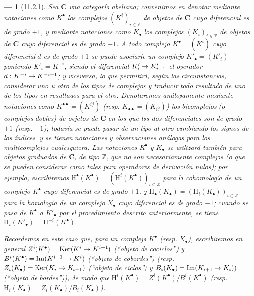 \documentclass[10pt,oneside,openany]{book}
\theoremstyle{egaenv}\newtheorem*{env}{---}
\theoremstyle{egastatement}
\theoremstyle{egadescription}
\renewcommand{\to}{\mathchoice{\longrightarrow}{\rightarrow}{\rightarrow}{\rightarrow}}
\begin{document}
\begin{env}[11.2.1]
\label{0.11.2.1}
\label{0.11.2.1-fr}
Sea $\boldsymbol{C}$ una categoría abeliana; convenimos en denotar mediante notaciones como $K^\bullet$ los \emph{complejos $(K^i)_{i\in\mathbb Z}$} de objetos de $\boldsymbol{C}$ cuyo diferencial es de grado $+1$, y mediante notaciones como $K_\bullet$ los complejos $(K_i)_{i\in\mathbb Z}$ de objetos de $\boldsymbol{C}$ cuyo diferencial es de grado $-1$.
A todo complejo $K^\bullet=(K^i)$ cuyo diferencial $d$ es de grado $+1$ se puede asociarle un complejo $K'_\bullet=(K'_i)$ poniendo $K'_i=K^{-i}$, siendo el diferencial $K'_i\to K'_{i-1}$ el operador $d:K^{-i}\to K^{-i+1}$; y \emph{viceversa}, lo que permitirá, según las circunstancias, considerar uno u otro de los tipos de complejos y traducir todo resultado de uno de los tipos en resultados para el otro.
Denotaremos análogamente mediante notaciones como $K^{\bullet\bullet}=(K^{ij})$ (resp. $K_{\bullet\bullet}=(K_{ij})$) los \emph{bicomplejos} (o \emph{complejos dobles}) de objetos de $\boldsymbol{C}$ en los que los \emph{dos} diferenciales son de grado $+1$ (resp. $-1$); todavía se puede pasar de un tipo al otro cambiando los signos de los índices, y se tienen notaciones y observaciones análogas para los multicomplejos cualesquiera.
Las notaciones $K^\bullet$ y $K_\bullet$ se utilizará también para \emph{objetos graduados} de $\boldsymbol{C}$, de tipo $\mathbb Z$, que no son necesariamente complejos (o que se pueden considerar como tales para operadores de derivación \emph{nulos}); por ejemplo, escribiremos
$\mathrm H^\bullet(K^\bullet)=(\mathrm H^i(K^\bullet))_{i\in\mathbb Z}$ para la \emph{cohomología} de un complejo $K^\bullet$ cuyo diferencial es de grado $+1$, y $\mathrm H_\bullet(K_\bullet)=(\mathrm H_i(K_\bullet))_{i\in\mathbb Z}$ para la \emph{homología} de un complejo $K_\bullet$ cuyo diferencial es de grado $-1$; cuando se pasa de $K^\bullet$ a $K'_\bullet$ por el procedimiento descrito anteriormente, se tiene $\mathrm H_i(K'_\bullet)=\mathrm H^{-i}(K^\bullet)$.

Recordemos en este caso que, para un complejo $K^\bullet$ (resp. $K_\bullet$), escribiremos en general $Z^i(K^\bullet)=\operatorname{Ker}(K^i\to K^{i+1})$ (``objeto de cociclos'') y $B^i(K^\bullet)=\operatorname{Im}(K^{i-1}\to K^i)$ (``objeto de cobordes'') (resp. $Z_i(K_\bullet)=\operatorname{Ker}(K_i\to K_{i-1})$ (``objeto de ciclos'') y $B_i(K_\bullet)=\operatorname{Im}(K_{i+1}\to K_i))$ (``objeto de bordes'')), de modo que $\mathrm H^i(K^\bullet)=Z^i(K^\bullet)/B^i(K^\bullet)$ (resp. $\mathrm H_i(K_\bullet)=Z_i(K_\bullet)/B_i(K_\bullet)$).


\end{env}
\end{document}
